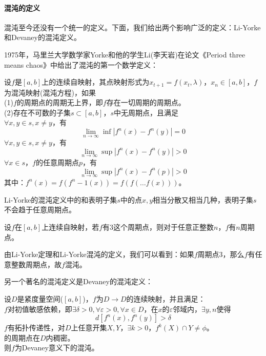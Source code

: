         \paragraph{混沌的定义}混沌至今还没有一个统一的定义。下面，我们给出两个影响广泛的定义：Li-Yorke和Devaney的混沌定义。
        \par
        1975年，马里兰大学数学家Yorke和他的学生Li(李天岩)在论文《Period three means chaos》中给出了混沌的第一个数学定义：
        \begin{definition}[Li 混沌]
        设$f$是$[a,b]$上的连续自映射，其点映射形式为$x_{t+1}=f(x_t,\lambda)$，$x_n\in [a,b]$，$f$为混沌映射(混沌方程)，如果\\
        (1)$f$的周期点的周期无上界，即$f$存在一切周期的周期点。\\
        (2)存在不可数的子集$s\subset[a,b]$，$s$中无周期点，且满足\\
        $\forall x,y\in s,x\neq y$，有
        \[
            \lim_{n\rightarrow\infty}\inf|f^n(x)-f^n(y)|=0
        \]
        $\forall x,y\in s,x\neq y$，有
        \[
            \lim_{n\rightarrow\infty}\sup|f^n(x)-f^n(y)|>0
        \]
        $\forall x \in s$，$f$的任意周期点$p$，有
        \[
            \lim_{n\rightarrow\infty}\sup|f^n(x)-f^n(p)|>0
        \]
        其中：$f^n(x)=f(f^n-1(x))=f(f(\dots f(x)))$。
        \end{definition}
        \par
        Li-Yorke的混沌定义中的和表明子集$s$中的点$x,y$相当分散又相当几种，表明子集$s$不会趋于任意周期点。
        \begin{theorem}[Li-Yorke定理]
        设$f$在$[a,b]$上连续自映射，若$f$有3这个周期点，则对于任意正整数$n$，$f$有$n$周期点。
        \end{theorem}
        \par
        由Li-Yorke定理和Li-Yorke混沌的定义，我们可以看到：如果$f$周期点3，那么$f$有任意整数周期点，故$f$混沌。
        \par
        另一个著名的混沌定义是Devaney的混沌定义：
        \begin{definition}[Devaney 混沌]
        设$D$是紧度量空间($[a,b]$)，$f$为$D\rightarrow D$的连续映射，并且满足：\\
        $f$对初值敏感依赖，即$\exists \delta > 0,\forall \varepsilon > 0,\forall x \in D$，在$x$的$\varepsilon$邻域内，$\exists y,n$使得
        \[
            d[f^n(x),f^n(y)]>\delta
        \]
        $f$有拓扑传递性，对$D$上任意开集$X,Y$，$\exists k>0$，$f^k(X)\cap Y \neq \phi$。\\
        的周期点在$D$内稠密。\\
        则$f$为Devaney意义下的混沌。
        \end{definition}
